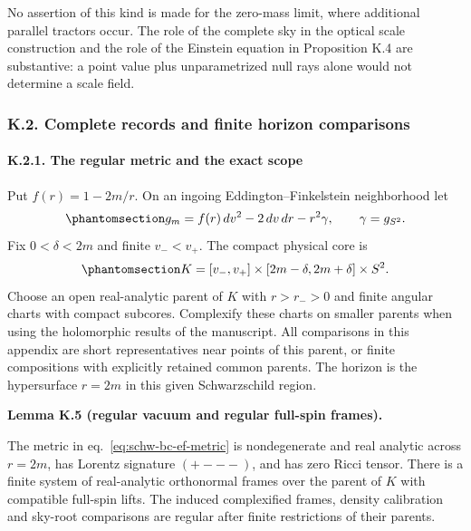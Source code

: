 \documentclass[
  english,
  11pt,
  reqno]{amsart}
\makeatletter
\newcommand{\pandocstatementheading}[1]{%
  \par\addpenalty{\@beginparpenalty}%
  \addvspace{.5\baselineskip plus .2\baselineskip minus .2\baselineskip}%
  {\normalfont\bfseries #1\par}%
  \nobreak\@afterindenttrue\@afterheading
}
\makeatother
\begin{document}
No assertion of this kind is made for the zero-mass limit, where
additional parallel tractors occur. The role of the complete sky in the
optical scale construction and the role of the Einstein equation in
Proposition K.4 are substantive: a point value plus unparametrized null
rays alone would not determine a scale field.

\protect{}\label{sec:sh-integrated-comparison}

\subsubsection{K.2. Complete records and finite horizon
comparisons}\label{k.2.-complete-records-and-finite-horizon-comparisons}

\protect{}\label{sec:schw-bc-regular-metric}

\protect{}\label{sec:sh-comparison-1}

\paragraph{K.2.1. The regular metric and the exact
scope}\label{k.2.1.-the-regular-metric-and-the-exact-scope}

Put \(f(r)=1-2m/r\). On an ingoing Eddington--Finkelstein neighborhood
let \begin{equation}\protect\phantomsection\label{eq:schw-bc-ef-metric}{
 g_m=f(r)\,dv^2-2\,dv\,dr-r^2\gamma,
 \qquad \gamma=g_{S^2}.
}\end{equation} Fix \(0<\delta<2m\) and finite \(v_-<v_+\). The compact
physical core is
\begin{equation}\protect\phantomsection\label{eq:schw-bc-physical-core}{
 K=[v_-,v_+]\times[2m-\delta,2m+\delta]\times S^2.
}\end{equation} Choose an open real-analytic parent of \(K\) with
\(r>r_->0\) and finite angular charts with compact subcores. Complexify
these charts on smaller parents when using the holomorphic results of
the manuscript. All comparisons in this appendix are short
representatives near points of this parent, or finite compositions with
explicitly retained common parents. The horizon is the hypersurface
\(r=2m\) in this given Schwarzschild region.

\pandocstatementheading{\protect{}\label{lem:schw-bc-ef-vacuum}Lemma K.5 (regular vacuum and regular full-spin frames).}

The metric in eq.~\ref{eq:schw-bc-ef-metric} is nondegenerate and real
analytic across \(r=2m\), has Lorentz signature \((+---)\), and has zero
Ricci tensor. There is a finite system of real-analytic orthonormal
frames over the parent of \(K\) with compatible full-spin lifts. The
induced complexified frames, density calibration and sky-root
comparisons are regular after finite restrictions of their parents.
\end{document}
